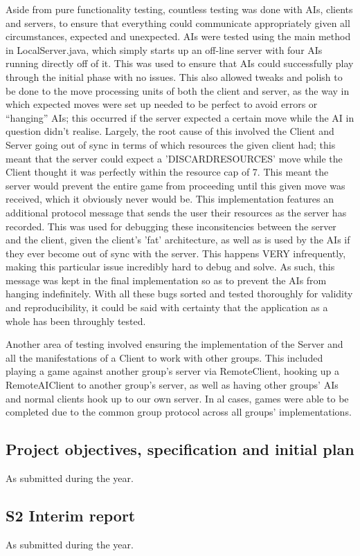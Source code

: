 \documentclass[a4paper,doc,draftfirst]{apa6}
\begin{document}
Aside from pure functionality testing, countless testing was done with AIs, clients and servers, to ensure that everything could communicate appropriately given all circumstances, expected and unexpected. AIs were tested using the main method in LocalServer.java, which simply starts up an off-line server with four AIs running directly off of it. This was used to ensure that AIs could successfully play through the initial phase with no issues. This also allowed tweaks and polish to be done to the move processing units of both the client and server, as the way in which expected moves were set up needed to be perfect to avoid errors or “hanging” AIs; this occurred if the server expected a certain move while the AI in question didn’t realise. Largely, the root cause of this involved the Client and Server going out of sync in terms of which resources the given client had; this meant that the server could expect a 'DISCARDRESOURCES' move while the Client thought it was perfectly within the resource cap of 7. This meant the server would prevent the entire game from proceeding until this given move was received, which it obviously never would be. This implementation features an additional protocol message that sends the user their resources as the server has recorded. This was used for debugging these inconsitencies between the server and the client, given the client's 'fat' architecture, as well as is used by the AIs if they ever become out of sync with the server. This happens VERY infrequently, making this particular issue incredibly hard to debug and solve. As such, this message was kept in the final implementation so as to prevent the AIs from hanging indefinitely. With all these bugs sorted and tested thoroughly for validity and reproducibility, it could be said with certainty that the application as a whole has been throughly tested.

Another area of testing involved ensuring the implementation of the Server and all the manifestations of a Client to work with other groups. This included playing a game against another group's server via RemoteClient, hooking up a RemoteAIClient to another group's server, as well as having other groups' AIs and normal clients hook up to our own server. In al cases, games were able to be completed due to the common group protocol across all groups' implementations.


\begin{appendices}

\subsection{Project objectives, specification and initial plan}
As submitted during the year.






\subsection{S2 Interim report}
As submitted during the year.



\end{appendices}
\end{document}
